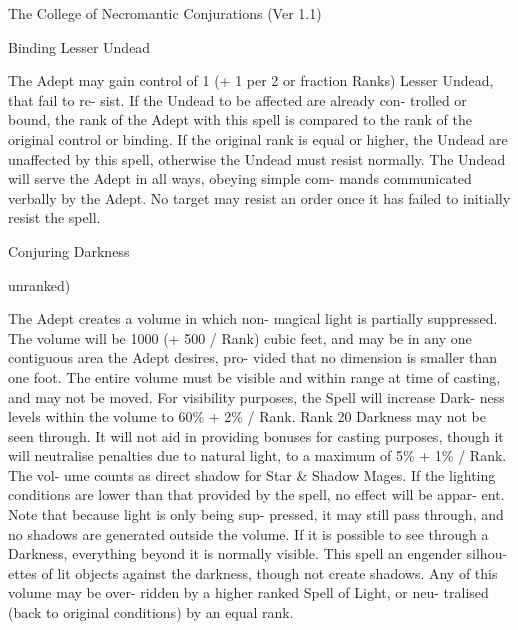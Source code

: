 \begin{Chapter}{The College of Necromantic Conjurations (Ver 1.1)}
\begin{spell}[G-2]{Binding Lesser Undead}
\begin{effects}
The Adept may gain control of 1 (+ 1 per 2 
or  fraction  Ranks)  Lesser  Undead,  that  fail  to  re-
sist.  If  the  Undead  to  be  affected  are  already  con-
trolled  or  bound,  the  rank  of  the  Adept  with  this 
spell is compared to the rank of the original control 
or  binding.  If  the  original  rank  is  equal  or  higher, 
the  Undead  are  unaffected by  this  spell,  otherwise 
the Undead must resist normally. The Undead will 
serve  the  Adept  in  all  ways,  obeying  simple  com-
mands  communicated  verbally  by  the  Adept.  No 
target  may  resist  an  order  once  it  has  failed  to 
initially resist the spell. 

\end{effects}
\end{spell}

\begin{spell}[G-3]{Conjuring Darkness}

unranked) 
\begin{effects}
The Adept creates a volume in which non-
magical  light  is  partially  suppressed.  The  volume 
will be 1000 (+ 500 / Rank) cubic feet, and may be 
in any one contiguous area the Adept desires, pro-
vided  that  no  dimension  is  smaller  than  one  foot. 
The entire volume must be visible and within range 
at  time  of  casting,  and  may  not  be  moved.  For 
visibility  purposes,  the  Spell  will  increase  Dark-
ness levels within the volume to 60\% + 2\% / Rank. 
Rank 20 Darkness may not be seen through. It will 
not  aid  in  providing  bonuses  for  casting  purposes, 
though  it  will  neutralise  penalties  due  to  natural 
light, to a maximum of 5\% + 1\% / Rank. The vol-
ume  counts  as  direct  shadow  for  Star  \&  Shadow 
Mages.  If  the  lighting  conditions  are  lower  than 
that provided by the spell, no effect  will be appar-
ent.  Note  that  because  light  is  only  being  sup-
pressed, it may still pass through, and no shadows 
are generated outside the volume. If it is possible to 
see  through  a  Darkness,  everything  beyond  it  is 
normally  visible.  This  spell  an  engender  silhou-
ettes of lit objects against the darkness, though not 
create  shadows.  Any  of  this  volume  may  be  over-
ridden  by  a  higher  ranked  Spell  of  Light,  or  neu-
tralised  (back  to  original  conditions)  by  an  equal 
rank. 


\end{effects}
\end{spell}
\end{Chapter}
